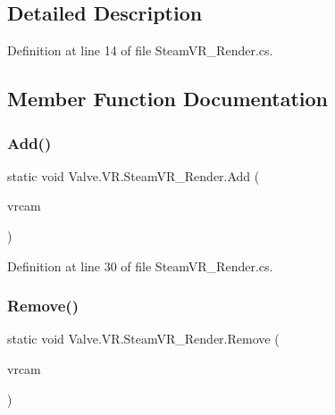 \subsection{Detailed Description}


Definition at line 14 of file Steam\+V\+R\+\_\+\+Render.\+cs.



\subsection{Member Function Documentation}
\mbox{\label{class_valve_1_1_v_r_1_1_steam_v_r___render_a7ea09b18f7b096dca11e1ca1d66ea869}} 
\subsubsection{\texorpdfstring{Add()}{Add()}}
{\footnotesize\ttfamily static void Valve.\+V\+R.\+Steam\+V\+R\+\_\+\+Render.\+Add (\begin{DoxyParamCaption}\item[{\mbox{\hyperlink{class_valve_1_1_v_r_1_1_steam_v_r___camera}{Steam\+V\+R\+\_\+\+Camera}}}]{vrcam }\end{DoxyParamCaption})\hspace{0.3cm}{\ttfamily [static]}}



Definition at line 30 of file Steam\+V\+R\+\_\+\+Render.\+cs.

\mbox{\label{class_valve_1_1_v_r_1_1_steam_v_r___render_a3c9d43d12a9793294f79f5022223e0f5}} 
\subsubsection{\texorpdfstring{Remove()}{Remove()}}
{\footnotesize\ttfamily static void Valve.\+V\+R.\+Steam\+V\+R\+\_\+\+Render.\+Remove (\begin{DoxyParamCaption}\item[{\mbox{\hyperlink{class_valve_1_1_v_r_1_1_steam_v_r___camera}{Steam\+V\+R\+\_\+\+Camera}}}]{vrcam }\end{DoxyParamCaption})\hspace{0.3cm}{\ttfamily [static]}}



